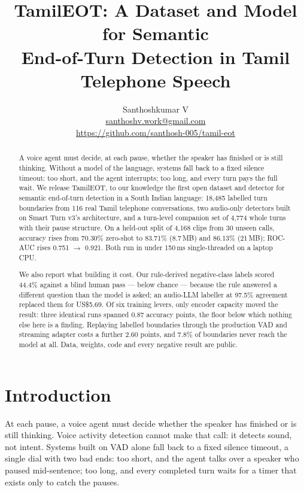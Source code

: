 \documentclass[11pt]{article}
\title{\textbf{TamilEOT: A Dataset and Model for Semantic\\End-of-Turn Detection in Tamil Telephone Speech}}
\author{Santhoshkumar V\\[2pt]
\small \href{mailto:santhoshv.work@gmail.com}{santhoshv.work@gmail.com}\\[2pt]
\small \url{https://github.com/santhosh-005/tamil-eot}}
\date{}
\newcommand{\pct}{\%}
\begin{document}
\maketitle

\begin{abstract}
\noindent
A voice agent must decide, at each pause, whether the speaker has finished or
is still thinking. Without a model of the language, systems fall back to a
fixed silence timeout: too short, and the agent interrupts; too long, and every
turn pays the full wait. We release TamilEOT, to our knowledge the first open
dataset and detector for semantic end-of-turn detection in a South Indian
language: 18,485 labelled turn boundaries from 116 real Tamil telephone
conversations, two audio-only detectors built on Smart Turn v3's architecture,
and a turn-level companion set of 4,774 whole turns with their pause structure.
On a held-out split of 4,168 clips from 30 unseen calls, accuracy rises from
70.30\pct{} zero-shot to 83.71\pct{} (8.7\,MB) and 86.13\pct{} (21\,MB); ROC-AUC
rises 0.751 $\rightarrow$ 0.921. Both run in under 150\,ms single-threaded on a
laptop CPU.

We also report what building it cost. Our rule-derived negative-class labels
scored 44.4\pct{} against a blind human pass --- below chance --- because the
rule answered a different question than the model is asked; an audio-LLM
labeller at 97.5\pct{} agreement replaced them for US\$5.69. Of six training
levers, only encoder capacity moved the result: three identical runs spanned
0.87 accuracy points, the floor below which nothing else here is a finding.
Replaying labelled boundaries through the production VAD and streaming adapter
costs a further 2.60 points, and 7.8\pct{} of boundaries never reach the model
at all. Data, weights, code and every negative result are public.
\end{abstract}

\section{Introduction}
\label{sec:intro}

At each pause, a voice agent must decide whether the speaker has finished or is
still thinking. Voice activity detection cannot make that call: it detects
sound, not intent. Systems built on VAD alone fall back to a fixed silence
timeout, a single dial with two bad ends: too short, and the agent talks over a
speaker who paused mid-sentence; too long, and every completed turn waits for a
timer that exists only to catch the pauses.
\end{document}
